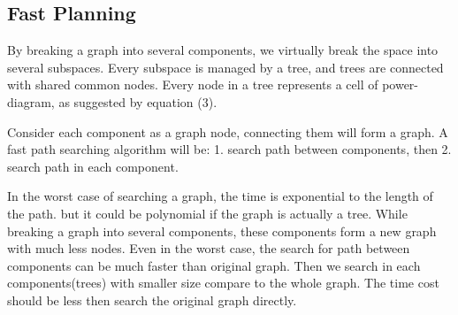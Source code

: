 \documentclass[11pt]{article}
\newtheorem{theorem}{Theorem}[section]
\begin{document}

  \subsection{Fast Planning}
  \indent\indent By breaking a graph into several components, we virtually break the space into several subspaces. Every subspace is managed by a tree, and trees are connected with shared common nodes. Every node in a tree represents a cell of power-diagram, as suggested by equation (3). 
 
  \indent Consider each component as a graph node, connecting them will form a graph. A fast path searching algorithm will be: 1. search path between components, then 2. search path in each component. 
  
  \indent In the worst case of searching a graph, the time is exponential to the length of the path. but it could be polynomial if the graph is actually a tree.  While breaking a graph into several components, these components form a new graph with much less nodes. Even in the worst case, the search for path between components can be much faster than original graph. Then we search in each components(trees) with smaller size compare to the whole graph. The time cost should be less then search the original graph directly. 
  

%
\end{document}
